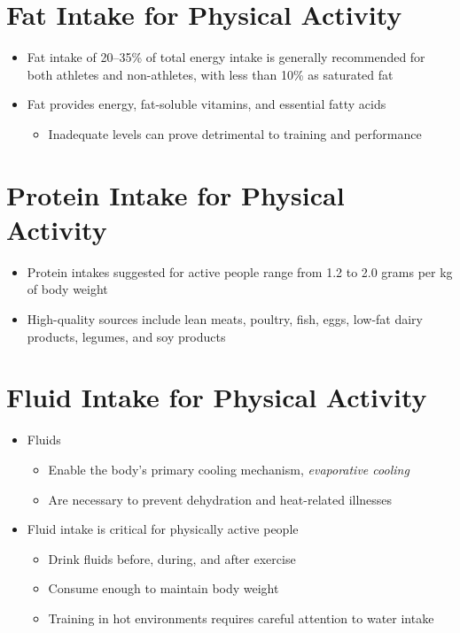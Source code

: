 \documentclass[title={Chapter 11}]{fdsn201notes}
\begin{document}
\section{Fat Intake for Physical Activity}\label{sec:fat-intake-for-physical-activity}
\begin{itemize}
	\item Fat intake of 20--35\% of total energy intake is generally recommended for both athletes and non-athletes, with less than 10\% as saturated fat
	\item Fat provides energy, fat-soluble vitamins, and essential fatty acids
	\begin{itemize}
		\item Inadequate levels can prove detrimental to training and performance
	\end{itemize}
\end{itemize}

\section{Protein Intake for Physical Activity}\label{sec:protein-intake-for-physical-activity}
\begin{itemize}
	\item Protein intakes suggested for active people range from 1.2 to 2.0 grams per kg of body weight
	\item High-quality sources include lean meats, poultry, fish, eggs, low-fat dairy products, legumes, and soy products
\end{itemize}

\section{Fluid Intake for Physical Activity}\label{sec:fluid-intake-for-physical-activity}
\begin{itemize}
	\item Fluids
	\begin{itemize}
		\item Enable the body’s primary cooling mechanism, \emph{evaporative cooling}
		\item Are necessary to prevent dehydration and heat-related illnesses
	\end{itemize}
	\item Fluid intake is critical for physically active people
	\begin{itemize}
		\item Drink fluids before, during, and after exercise
		\item Consume enough to maintain body weight
		\item Training in hot environments requires careful attention to water intake
	\end{itemize}
\end{itemize}
\end{document}
